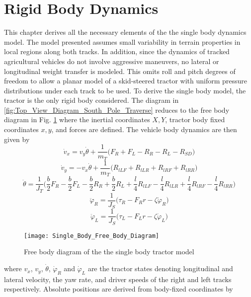 \section{Rigid Body Dynamics}\label{s:Rigid_Body_Dynamics}
This chapter derives all the necessary elements of the the single body dynamics model. The model presented assumes small variability in terrain properties in local regions along both tracks. In addition, since the dynamics of tracked agricultural vehicles do not involve aggressive maneuvers, no lateral or longitudinal weight transfer is modeled. This omits roll and pitch degrees of freedom to allow a planar model of a skid-steered tractor with uniform pressure distributions under each track to be used. To derive the single body model, the tractor is the only rigid body considered. The diagram in \ref{fig:Top_View_Diagram_South_Pole_Traverse} reduces to the free body diagram in Fig. \ref{fig:Single_Body_Free_Body_Diagram} where the inertial coordinates $X, Y$, tractor body fixed coordinates $x, y$, and forces are defined. The vehicle body dynamics are then given by
\begin{equation}\label{eq:RSBD_GBSDX}
    \dot v_x = v_y\dot\theta + \frac{1}{m_T}\Big(F_R + F_L - R_R - R_L - R_{SD} \Big)
\end{equation}
\begin{equation}
    \dot v_y = -v_x\dot\theta + \frac{1}{m_T}\Big(R_{lLF} + R_{lLR} + R_{lRF} + R_{lRR} \Big)
\end{equation}
\begin{equation}
    \ddot\theta = \frac{1}{J_T} \Bigg( \frac{b}{2}F_R - \frac{b}{2}F_L - \frac{b}{2}R_R + \frac{b}{2}R_L + \frac{l}{4}R_{lLF} - \frac{l}{4}R_{lLR} + \frac{l}{4}R_{lRF} - \frac{l}{4}R_{lRR} \Bigg)
\end{equation}
\begin{equation}
    \ddot\varphi_R = \frac{1}{J_S}\Big(\tau_R - F_Rr - \zeta\dot\varphi_R\Big)
\end{equation}
\begin{equation}\label{eq:RSBD_WBSDL}
    \ddot\varphi_L = \frac{1}{J_S}\Big(\tau_L - F_Lr - \zeta\dot\varphi_L\Big)
\end{equation}
\begin{figure}[tb]
    \centering
    \texttt{[image: Single\_Body\_Free\_Body\_Diagram]}
    \caption{Free body diagram of the the single body tractor model}
    \label{fig:Single_Body_Free_Body_Diagram}
\end{figure}
where $v_x$, $v_y$, $\dot\theta$, $\dot\varphi_R$ and $\dot\varphi_L$  are the tractor states denoting longitudinal and lateral velocity, the yaw rate, and driver speeds of the right and left tracks respectively. Absolute positions are derived from body-fixed coordinates by
